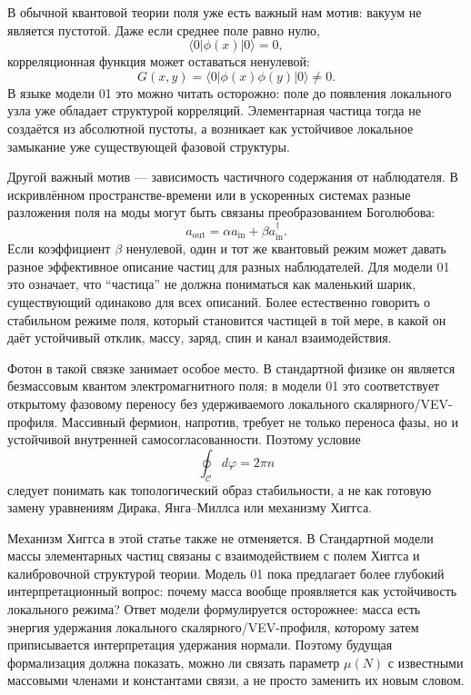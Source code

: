 \documentclass[11pt,a4paper]{article}
\newcommand{\phase}{\varphi}
\newcommand{\contour}{\mathcal{C}}
\begin{document}
В обычной квантовой теории поля уже есть важный нам мотив: вакуум не является пустотой. Даже если среднее поле равно нулю,
\begin{equation}
\langle 0|\phi(x)|0\rangle = 0,
\end{equation}
корреляционная функция может оставаться ненулевой:
\begin{equation}
G(x,y)=\langle 0|\phi(x)\phi(y)|0\rangle \neq 0.
\end{equation}
В языке модели 01 это можно читать осторожно: поле до появления локального узла уже обладает структурой корреляций. Элементарная частица тогда не создаётся из абсолютной пустоты, а возникает как устойчивое локальное замыкание уже существующей фазовой структуры.

Другой важный мотив --- зависимость частичного содержания от наблюдателя. В искривлённом пространстве-времени или в ускоренных системах разные разложения поля на моды могут быть связаны преобразованием Боголюбова:
\begin{equation}
a_{\mathrm{out}}=\alpha a_{\mathrm{in}}+\beta a_{\mathrm{in}}^{\dagger}.
\end{equation}
Если коэффициент $\beta$ ненулевой, один и тот же квантовый режим может давать разное эффективное описание частиц для разных наблюдателей. Для модели 01 это означает, что ``частица'' не должна пониматься как маленький шарик, существующий одинаково для всех описаний. Более естественно говорить о стабильном режиме поля, который становится частицей в той мере, в какой он даёт устойчивый отклик, массу, заряд, спин и канал взаимодействия.

Фотон в такой связке занимает особое место. В стандартной физике он является безмассовым квантом электромагнитного поля; в модели 01 это соответствует открытому фазовому переносу без удерживаемого локального скалярного/VEV-профиля. Массивный фермион, напротив, требует не только переноса фазы, но и устойчивой внутренней самосогласованности. Поэтому условие
\begin{equation}
\oint_{\contour} d\phase = 2\pi n
\end{equation}
следует понимать как топологический образ стабильности, а не как готовую замену уравнениям Дирака, Янга--Миллса или механизму Хиггса.

Механизм Хиггса в этой статье также не отменяется. В Стандартной модели массы элементарных частиц связаны с взаимодействием с полем Хиггса и калибровочной структурой теории. Модель 01 пока предлагает более глубокий интерпретационный вопрос: почему масса вообще проявляется как устойчивость локального режима? Ответ модели формулируется осторожнее: масса есть энергия удержания локального скалярного/VEV-профиля, которому затем приписывается интерпретация удержания нормали. Поэтому будущая формализация должна показать, можно ли связать параметр $\mu(N)$ с известными массовыми членами и константами связи, а не просто заменить их новым словом.
\end{document}
